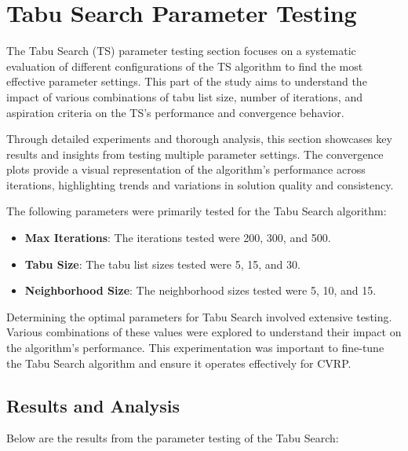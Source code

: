 \documentclass{article}
\begin{document}
    \clearpage

    \newpage


    \section{Tabu Search Parameter Testing}

    The Tabu Search (TS) parameter testing section focuses on a systematic evaluation of different configurations of the TS algorithm to find the most effective parameter settings. This part of the study aims to understand the impact of various combinations of tabu list size, number of iterations, and aspiration criteria on the TS's performance and convergence behavior.

    Through detailed experiments and thorough analysis, this section showcases key results and insights from testing multiple parameter settings. The convergence plots provide a visual representation of the algorithm’s performance across iterations, highlighting trends and variations in solution quality and consistency.


    The following parameters were primarily tested for the Tabu Search algorithm:

    \begin{itemize}
        \item \textbf{Max Iterations}: The iterations tested were 200, 300, and 500.
        \item \textbf{Tabu Size}: The tabu list sizes tested were 5, 15, and 30.
        \item \textbf{Neighborhood Size}: The neighborhood sizes tested were 5, 10, and 15.
    \end{itemize}

    Determining the optimal parameters for Tabu Search involved extensive testing. Various combinations of these values were explored to understand their impact on the algorithm's performance. This experimentation was important to fine-tune the Tabu Search algorithm and ensure it operates effectively for CVRP.

    \subsection{Results and Analysis}
    Below are the results from the parameter testing of the Tabu Search:
\end{document}
